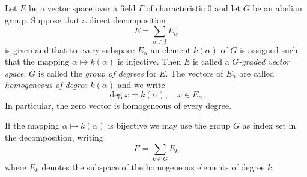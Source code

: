 Let $E$ be a vector space over a field $\Gamma$ of characteristic $0$ and let $G$ be an abelian group. Suppose that a direct decomposition
$$E = \sum_{\alpha \in I} E_{\alpha}$$
is given and that to every subspace $E_{\alpha}$ an element $k(\alpha)$ of $G$ is assigned such that the mapping $\alpha \mapsto k(\alpha)$ is injective. Then $E$ is called a \textit{$G$-graded vector space}. $G$ is called the \textit{group of degrees} for $E$. The vectors of $E_{\alpha}$ are called \textit{homogeneous of degree $k(\alpha)$} and we write
$$\deg x = k(\alpha), \quad x \in E_{\alpha}.$$
In particular, the zero vector is homogeneous of every degree.

If the mapping $\alpha \mapsto k(\alpha)$ is bijective we may use the group $G$ as index set in the decomposition, writing
$$E = \sum_{k \in G} E_k$$
where $E_k$ denotes the subspace of the homogeneous elements of degree $k$.
